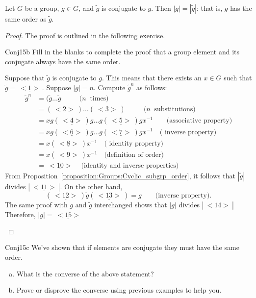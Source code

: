 \begin{prop}{} Let $G$ be a group, $g \in G$, and $\tilde{g}$ is conjugate to $g$. Then $|g| = |\tilde{g}|$: that is,  $g$ has the same order as $\tilde{g}$.
\end{prop}

\begin{proof}  The proof is outlined in the following exercise.

\begin{exercise}{Conj15b}
Fill in the blanks to complete the proof that a group element and its conjugate always have the same order.

Suppose that $\tilde{g}$ is conjugate to $g$. This means that there exists an $x\in G$ such that $\tilde{g}=\underline{~<1>~}$. Suppose $|g|=n$. Compute $\tilde{g}^n$ as follows:
\begin{align*}
 \tilde{g}^n&=(\tilde{g} \ldots \tilde{g}~~~~~~~~~~~~(n~\text{ times)}\\ 
&=(\underline{~<2>~}) \ldots (\underline{~<3>~})~~~~~~~~~~~~(n~\text{ substitutions)}\\ 
& =xg(\underline{~<4>~})g \ldots g(\underline{~<5>~})gx^{-1}\qquad\text{(associative property)}\\
&=xg(\underline{~<6>~})g...g(\underline{~<7>~})gx^{-1}\quad\text{( inverse property)}\\
&=x(\underline{~<8>~})x^{-1}\quad\text{( identity property)}\\
&=x(\underline{~<9>~})x^{-1}\quad\text{(definition of order)}\\
&=\underline{~<10>~}\quad\text{(identity and inverse properties)}
\end{align*}
\noindent
From Proposition~\ref{proposition:Groups:Cyclic_subgrp_order}, it follows that  $| \tilde{g}|$ divides $|\underline{~<11>~}|$. On the other hand, \[(\underline{~<12>~})\tilde{g}(\underline{~<13>~})=g\qquad\text{(inverse property)}.\]  
The same proof  with $g$ and $\tilde{g}$ interchanged shows that $|g|$ divides $|\underline{~<14>~}|$ Therefore,  $|g|=\underline{~<15>~}$ 
\end {exercise}
\end{proof}

\begin{exercise}{Conj15c}
We've shown that if elements are conjugate they must have the same order.
\begin{enumerate}[(a)]
\item What is the converse of the above statement?
\item Prove or disprove the converse using previous examples to help you.
\end{enumerate}
\end {exercise}
 
